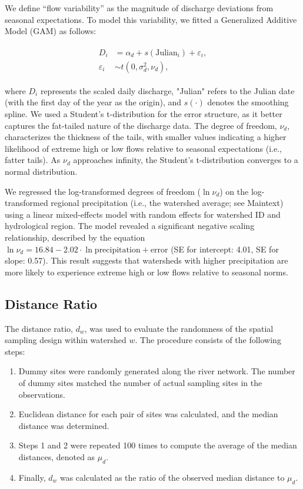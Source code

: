 \documentclass[11pt, class=article, crop=false]{standalone}
\theoremstyle{definition}
\begin{document}
We define ``flow variability'' as the magnitude of discharge deviations from seasonal expectations.
To model this variability, we fitted a Generalized Additive Model (GAM) as follows:

\begin{align}
    \begin{split}
    D_i &= \alpha_d + s(\text{Julian}_i) + \varepsilon_i,\\
    \varepsilon_i &\sim t(0, \sigma_d^2, \nu_d),
    \end{split}
\end{align}

where $D_i$ represents the scaled daily discharge, "Julian" refers to the Julian date (with the first day of the year as the origin), and $s(\cdot)$ denotes the smoothing spline.
We used a Student's t-distribution for the error structure, as it better captures the fat-tailed nature of the discharge data.
The degree of freedom, $\nu_d$, characterizes the thickness of the tails, with smaller values indicating a higher likelihood of extreme high or low flows relative to seasonal expectations (i.e., fatter tails).
As $\nu_d$ approaches infinity, the Student's t-distribution converges to a normal distribution.

We regressed the log-transformed degrees of freedom ($\ln \nu_d$) on the log-transformed regional precipitation (i.e., the watershed average; see Maintext) using a linear mixed-effects model with random effects for watershed ID and hydrological region.
The model revealed a significant negative scaling relationship, described by the equation $\ln \nu_d = 16.84 - 2.02 \cdot \ln \text{precipitation} + \text{error}$ (SE for intercept: 4.01, SE for slope: 0.57).
This result suggests that watersheds with higher precipitation are more likely to experience extreme high or low flows relative to seasonal norms.

\subsection{Distance Ratio}

The distance ratio, $d_{w}$, was used to evaluate the randomness of the spatial sampling design within watershed $w$.
The procedure consists of the following steps:

\begin{enumerate}
    \item Dummy sites were randomly generated along the river network. The number of dummy sites matched the number of actual sampling sites in the observations.
    \item Euclidean distance for each pair of sites was calculated, and the median distance was determined.
    \item Steps 1 and 2 were repeated 100 times to compute the average of the median distances, denoted as $\mu_d$.
    \item Finally, $d_{w}$ was calculated as the ratio of the observed median distance to $\mu_d$.
\end{enumerate}
\end{document}
